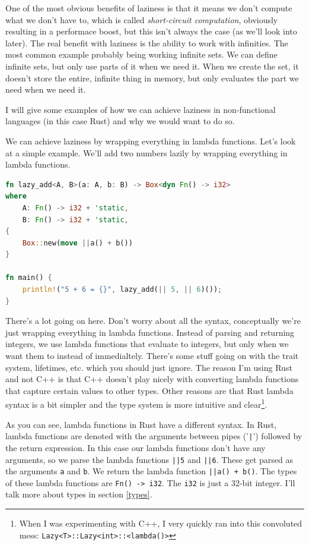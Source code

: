 \documentclass[11pt]{article}
\begin{document}
One of the most obvious benefits of laziness is that it means we don't compute
what we don't have to, which is called \emph{short-circuit computation},
obviously resulting in a performace boost, but this isn't always the case (as
we'll look into later). The real benefit with laziness is the ability to work
with infinities. The most common example probably being working infinite sets.
We can define infinite sets, but only use parts of it when we need it.  When we
create the set, it doesn't store the entire, infinite thing in memory, but only
evaluates the part we need when we need it.

I will give some examples of how we can achieve laziness in non-functional
languages (in this case Rust) and why we would want to do so.

We can achieve laziness by wrapping everything in lambda functions. Let's look
at a simple example. We'll add two numbers lazily by wrapping everything in
lambda functions.

\begin{lstlisting}[language=Rust]
fn lazy_add<A, B>(a: A, b: B) -> Box<dyn Fn() -> i32>
where
    A: Fn() -> i32 + 'static,
    B: Fn() -> i32 + 'static,
{
    Box::new(move ||a() + b())
}

fn main() {
    println!("5 + 6 = {}", lazy_add(|| 5, || 6)());
}
\end{lstlisting}

There's a lot going on here. Don't worry about all the syntax, conceptually
we're just wrapping everything in lambda functions. Instead of parsing and
returning integers, we use lambda functions that evaluate to integers, but only
when we want them to instead of immedialtely. There's some stuff going on with
the trait system, lifetimes, etc. which you should just ignore. The reason I'm
using Rust and not C++ is that C++ doesn't play nicely with converting lambda
functions that capture certain values to other types. Other reasons are that
Rust lambda syntax is a bit simpler and the type system is more intuitive and
clear\footnote{When I was experimenting with C++, I very quickly ran into this
convoluted mess: \texttt{Lazy<T>::Lazy<int>::<lambda()>}}.

As you can see, lambda functions in Rust have a different syntax. In Rust,
lambda functions are denoted with the arguments between pipes ('\texttt{|}')
followed by the return expression. In this case our lambda functions don't have
any arguments, so we parse the lambda functions \texttt{||5} and \texttt{||6}.
These get parsed as the arguments \texttt{a} and \texttt{b}. We return the
lambda function \texttt{||a() + b()}. The types of these lambda functions are
\texttt{Fn()\ ->\ i32}. The \texttt{i32} is just a 32-bit integer. I'll talk
more about types in section \ref{types}.
\end{document}
